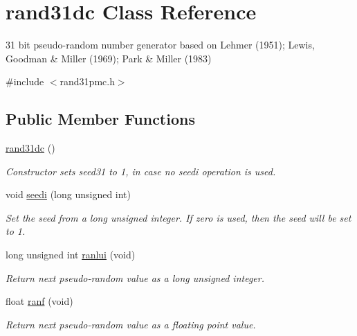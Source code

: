 \hypertarget{classrand31dc}{\section{rand31dc Class Reference}
\label{classrand31dc}
}


31 bit pseudo-\/random number generator based on Lehmer (1951); Lewis, Goodman \& Miller (1969); Park \& Miller (1983)  




{\ttfamily \#include $<$rand31pmc.\+h$>$}

\subsection*{Public Member Functions}
\begin{DoxyCompactItemize}
\item 
\hypertarget{classrand31dc_ab57e4bf816dd2d20c052fd951338d845}{\hyperlink{classrand31dc_ab57e4bf816dd2d20c052fd951338d845}{rand31dc} ()}\label{classrand31dc_ab57e4bf816dd2d20c052fd951338d845}

\begin{DoxyCompactList}\small\item\em Constructor sets seed31 to 1, in case no seedi operation is used. \end{DoxyCompactList}\item 
\hypertarget{classrand31dc_a8890a8223643fff52fff7a332e2053c6}{void \hyperlink{classrand31dc_a8890a8223643fff52fff7a332e2053c6}{seedi} (long unsigned int)}\label{classrand31dc_a8890a8223643fff52fff7a332e2053c6}

\begin{DoxyCompactList}\small\item\em Set the seed from a long unsigned integer. If zero is used, then the seed will be set to 1. \end{DoxyCompactList}\item 
\hypertarget{classrand31dc_a6694db8a614a793f4a00473f8b7ea409}{long unsigned int \hyperlink{classrand31dc_a6694db8a614a793f4a00473f8b7ea409}{ranlui} (void)}\label{classrand31dc_a6694db8a614a793f4a00473f8b7ea409}

\begin{DoxyCompactList}\small\item\em Return next pseudo-\/random value as a long unsigned integer. \end{DoxyCompactList}\item 
\hypertarget{classrand31dc_ae3fd0aa4320143ee001e408587bb7844}{float \hyperlink{classrand31dc_ae3fd0aa4320143ee001e408587bb7844}{ranf} (void)}\label{classrand31dc_ae3fd0aa4320143ee001e408587bb7844}

\begin{DoxyCompactList}\small\item\em Return next pseudo-\/random value as a floating point value. \end{DoxyCompactList}\end{DoxyCompactItemize}


